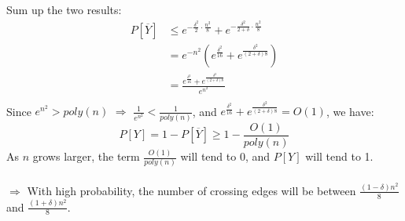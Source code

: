 \documentclass{article}
\begin{document}
Sum up the two results:
\[
\begin{aligned}
P[\overline{Y}] &\leq e^{-\frac{\delta^2}{2} \cdot \frac{n^2}{8}} + e^{-\frac{\delta^2}{2+\delta} \cdot \frac{n^2}{8}} \\
                        &= e^{-n^2}(e^{\frac{\delta^2}{16}} + e^{\frac{\delta^2}{(2+\delta)8}}) \\     
                        &= \frac{e^{\frac{\delta^2}{16}} + e^{\frac{\delta^2}{(2+\delta)8}}}{e^{n^2}}  \\
\end{aligned}
\]
Since $e^{n^2} > poly(n)$ $\Rightarrow$ $\frac{1}{e^{n^2}} < \frac{1}{poly(n)}$, and  $e^{\frac{\delta^2}{16}} + e^{\frac{\delta^2}{(2+\delta)8}} = O(1)$, we have:
\[
P[Y] = 1 - P[\overline{Y}] \geq 1 - \frac{O(1)}{poly(n)}
\]
As $n$ grows larger, the term $\frac{O(1)}{poly(n)}$ will tend to 0, and $P[Y]$ will tend to 1. \\\\
$\Rightarrow$ With high probability, the number of crossing edges will be between $\frac{(1-\delta)n^2}{8}$ and $\frac{(1+\delta)n^2}{8}$.
\end{document}
